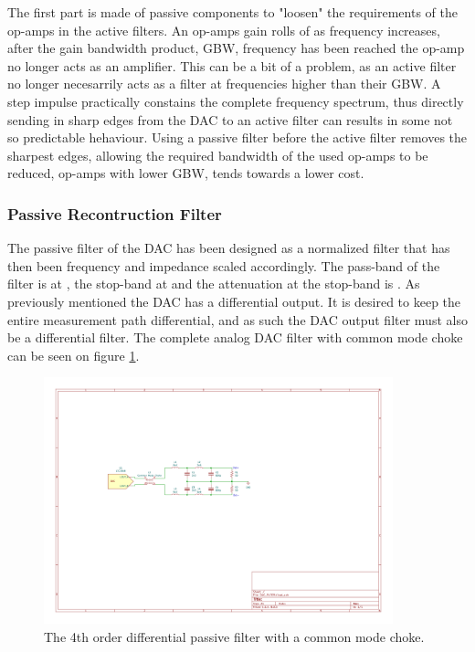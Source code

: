 The first part is made of passive components to "loosen" the requirements of the op-amps in the active filters. An op-amps gain rolls of as frequency increases, after the gain bandwidth product, GBW, frequency has been reached the op-amp no longer acts as an amplifier. This can be a bit of a problem, as an active filter no longer necesarrily acts as a filter at frequencies higher than their GBW. A step impulse practically constains the complete frequency spectrum, thus directly sending in sharp edges from the DAC to an active filter can results in some not so predictable hehaviour. Using a passive filter before the active filter removes the sharpest edges, allowing the required bandwidth of the used op-amps to be reduced, op-amps with lower GBW, tends towards a lower cost.

\subsubsection{Passive Recontruction Filter}
The passive filter of the DAC has been designed as a normalized filter that has then been frequency and impedance scaled accordingly. The pass-band of the filter is at , the stop-band at  and the attenuation at the stop-band is . As previously mentioned the DAC has a differential output. It is desired to keep the entire measurement path differential, and as such the DAC output filter must also be a differential filter. The complete analog DAC filter with common mode choke can be seen on figure \ref{fig_7_1_1_DAC_PASSIVE}.

\begin{figure}[H]
    \centering
    \includegraphics[clip, trim=150 300 250 200, width=0.9\textwidth]{Sections/7_SystemDesign/Figures/7_1_1_DAC_PASSIVE_FILTER.pdf}
    \caption{The 4th order differential passive filter with a common mode choke.}
    \label{fig_7_1_1_DAC_PASSIVE}
\end{figure}

